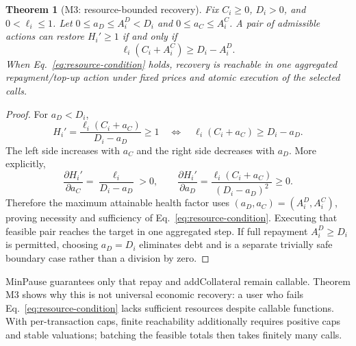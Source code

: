 \documentclass[sn-vancouver,Numbered]{sn-jnl}
\newtheorem{theorem}{Theorem}
\begin{document}
\begin{theorem}[M3: resource-bounded recovery]
Fix $C_i\geq0$, $D_i>0$, and $0<\ell_i\leq1$. Let $0\leq a_D\leq A_i^D<D_i$ and $0\leq a_C\leq A_i^C$. A pair of admissible actions can restore $H_i'\geq1$ if and only if
\begin{equation}
\ell_i(C_i+A_i^C)\geq D_i-A_i^D.
\label{eq:resource-condition}
\end{equation}
When Eq.~\eqref{eq:resource-condition} holds, recovery is reachable in one aggregated repayment/top-up action under fixed prices and atomic execution of the selected calls.
\end{theorem}
\begin{proof}
For $a_D<D_i$,
\[
H_i'=\frac{\ell_i(C_i+a_C)}{D_i-a_D}\geq1
\quad\Longleftrightarrow\quad
\ell_i(C_i+a_C)\geq D_i-a_D.
\]
The left side increases with $a_C$ and the right side decreases with $a_D$. More explicitly,
\[
\frac{\partial H_i'}{\partial a_C}=\frac{\ell_i}{D_i-a_D}>0,
\qquad
\frac{\partial H_i'}{\partial a_D}=
\frac{\ell_i(C_i+a_C)}{(D_i-a_D)^2}\geq0.
\]
Therefore the maximum attainable health factor uses $(a_D,a_C)=(A_i^D,A_i^C)$, proving necessity and sufficiency of Eq.~\eqref{eq:resource-condition}. Executing that feasible pair reaches the target in one aggregated step. If full repayment $A_i^D\geq D_i$ is permitted, choosing $a_D=D_i$ eliminates debt and is a separate trivially safe boundary case rather than a division by zero.
\end{proof}

MinPause guarantees only that \textsf{repay} and \textsf{addCollateral} remain callable. Theorem M3 shows why this is not universal economic recovery: a user who fails Eq.~\eqref{eq:resource-condition} lacks sufficient resources despite callable functions. With per-transaction caps, finite reachability additionally requires positive caps and stable valuations; batching the feasible totals then takes finitely many calls.
\end{document}
